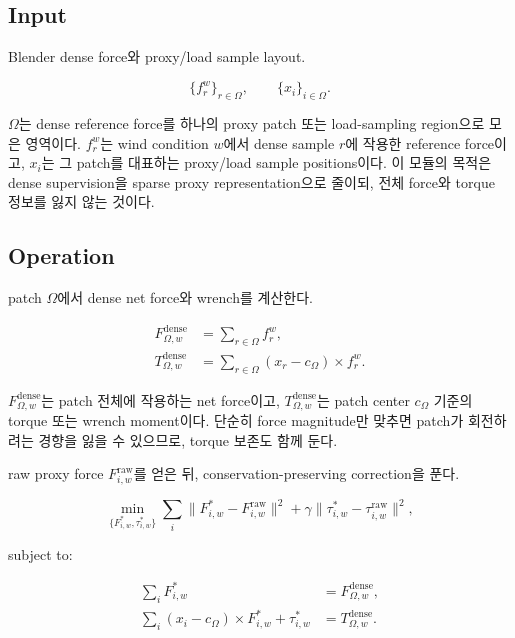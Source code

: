 \documentclass[11pt,a4paper]{article}
\begin{document}
\subsection*{Input}

Blender dense force와 proxy/load sample layout.

\begin{equation}
\{f_r^w\}_{r\in\Omega},\qquad \{x_i\}_{i\in\Omega}.
\end{equation}

$\Omega$는 dense reference force를 하나의 proxy patch 또는 load-sampling region으로 모은 영역이다.
$f_r^w$는 wind condition $w$에서 dense sample $r$에 작용한 reference force이고, $x_i$는 그 patch를 대표하는 proxy/load sample positions이다.
이 모듈의 목적은 dense supervision을 sparse proxy representation으로 줄이되, 전체 force와 torque 정보를 잃지 않는 것이다.

\subsection*{Operation}

patch $\Omega$에서 dense net force와 wrench를 계산한다.

\begin{align}
F_{\Omega,w}^{\mathrm{dense}} &= \sum_{r\in\Omega}f_r^w,\\
T_{\Omega,w}^{\mathrm{dense}} &= \sum_{r\in\Omega}(x_r-c_\Omega)\times f_r^w.
\end{align}

$F_{\Omega,w}^{\mathrm{dense}}$는 patch 전체에 작용하는 net force이고, $T_{\Omega,w}^{\mathrm{dense}}$는 patch center $c_\Omega$ 기준의 torque 또는 wrench moment이다.
단순히 force magnitude만 맞추면 patch가 회전하려는 경향을 잃을 수 있으므로, torque 보존도 함께 둔다.

raw proxy force $F_{i,w}^{\mathrm{raw}}$를 얻은 뒤, conservation-preserving correction을 푼다.

\begin{equation}
\min_{\{F_{i,w}^{*},\tau_{i,w}^{*}\}}\sum_i\|F_{i,w}^{*}-F_{i,w}^{\mathrm{raw}}\|^2+\gamma\|\tau_{i,w}^{*}-\tau_{i,w}^{\mathrm{raw}}\|^2,
\end{equation}

subject to:

\begin{align}
\sum_iF_{i,w}^{*} &= F_{\Omega,w}^{\mathrm{dense}},\\
\sum_i(x_i-c_\Omega)\times F_{i,w}^{*}+\tau_{i,w}^{*} &= T_{\Omega,w}^{\mathrm{dense}}.
\end{align}
\end{document}
